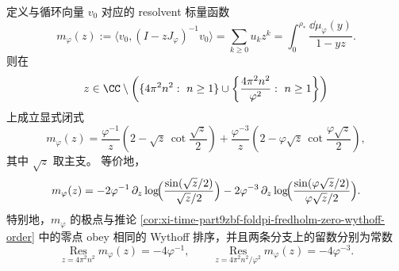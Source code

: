 \begin{theorem}\label{thm:xi-time-part9zbf-foldpi-cyclic-nevanlinna-double-cotangent}
定义与循环向量 \(v_0\) 对应的 resolvent 标量函数
\[
m_\varphi(z)
:=
\langle v_0,(I-zJ_\varphi)^{-1}v_0\rangle
=
\sum_{k\ge 0}u_k z^k
=
\int_0^{\rho_\ast}\frac{\dd\mu_\varphi(y)}{1-yz}.
\]
则在
\[
z\in
\CC\setminus
\left(
\{4\pi^2n^2:\ n\ge 1\}
\cup
\left\{\frac{4\pi^2n^2}{\varphi^2}:\ n\ge 1\right\}
\right)
\]
上成立显式闭式
\[
m_\varphi(z)
=
\frac{\varphi^{-1}}{z}
\left(
2-\sqrt z\,\cot\frac{\sqrt z}{2}
\right)
+
\frac{\varphi^{-3}}{z}
\left(
2-\varphi\sqrt z\,\cot\frac{\varphi\sqrt z}{2}
\right),
\]
其中 \(\sqrt z\) 取主支。
等价地，
\[
m_\varphi(z)
=
-2\varphi^{-1}\,\partial_z
\log\!\Bigl(\frac{\sin(\sqrt z/2)}{\sqrt z/2}\Bigr)
-2\varphi^{-3}\,\partial_z
\log\!\Bigl(\frac{\sin(\varphi\sqrt z/2)}{\varphi\sqrt z/2}\Bigr).
\]
特别地，\(m_\varphi\) 的极点与推论 \ref{cor:xi-time-part9zbf-foldpi-fredholm-zero-wythoff-order} 中的零点 obey 相同的 Wythoff 排序，并且两条分支上的留数分别为常数
\[
\operatorname*{Res}_{z=4\pi^2n^2}m_\varphi(z)=-4\varphi^{-1},
\qquad
\operatorname*{Res}_{z=4\pi^2n^2/\varphi^2}m_\varphi(z)=-4\varphi^{-3}.
\]
\end{theorem}
